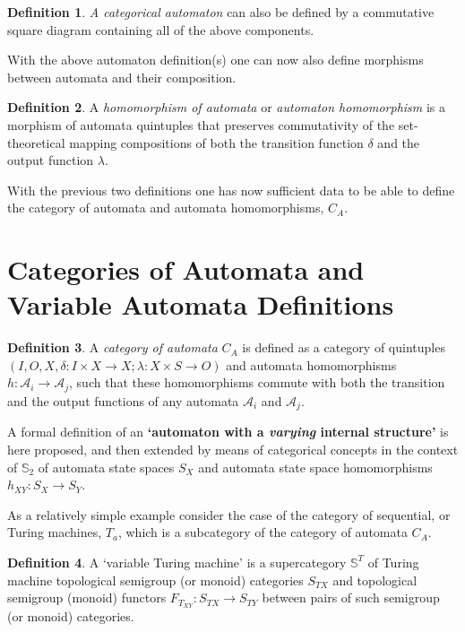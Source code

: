 \documentclass[12pt]{article}
\theoremstyle{plain}
\theoremstyle{definition}
\newtheorem{definition}{Definition}[section]
\numberwithin{equation}{section}
\newcommand{\A}{\mathcal A}
\begin{document}
\bigbreak

\begin{definition}
 {\em A categorical automaton} can also be defined by a commutative square diagram containing all of the above components. \end{definition}

 With the above automaton definition(s) one can now also define morphisms between automata and their composition.

\bigbreak

\begin{definition} A \emph{homomorphism of automata} or {\em automaton homomorphism} is a morphism of automata quintuples that preserves commutativity of the set-theoretical mapping compositions of both the transition
function $\delta$ and the output function $\lambda$. 
\end{definition}

\bigbreak

 With the previous two definitions one has now sufficient data to be able to define the category of automata 
and automata homomorphisms, $C_A$.

\section{Categories of Automata and Variable Automata Definitions}

\begin{definition}
 A {\em category of automata} {\bf $C_A$} is defined as a category of quintuples
$(I, O, X, \delta: I \times X \rightarrow X; \lambda: X \times S \rightarrow O)$ and
automata homomorphisms $h:{\A}_i \rightarrow {\A}_j$,
such that these homomorphisms commute with both the transition and the output functions of any automata ${\A}_i$ and ${\A}_j$.
\end{definition}

 \bigbreak

 A formal definition of an {\bf `automaton with a {\em varying} internal structure'} is here proposed, and then extended by means of categorical concepts in the context of  $\mathbb{S}_2$ of automata state spaces $S_X$ and automata state space homomorphisms $h_{XY}: S_X \to S_Y$.


 As a relatively simple example consider the case of the category of sequential, or Turing machines, {\bf $T_a$}, which is a subcategory of the category of automata {\bf $C_A$}. 

\begin{definition}
A `variable Turing machine' is a supercategory $\mathbb{S}^T$ of Turing machine topological semigroup (or monoid) categories {\bf $S_{TX}$} and topological semigroup (monoid) functors $F_{T_{XY}}: S_{TX} \to S_{TY}$  between pairs of such semigroup (or monoid) categories. 

\end{definition}
\end{document}
